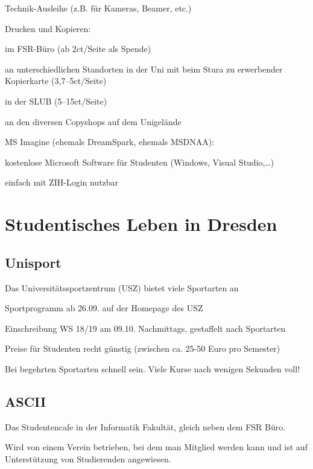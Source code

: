 \documentclass[a4paper,12pt]{report}
\begin{document}
\begin{itemize*}
\begin{itemize*}
        \item Technik-Ausleihe (z.B. für Kameras, Beamer, etc.)
    \end{itemize*}
    \item Drucken und Kopieren:
    \begin{itemize*}
        \item im FSR-Büro (ab 2ct/Seite als Spende)
        \item an unterschiedlichen Standorten in der Uni mit beim Stura zu erwerbender Kopierkarte (3,7--5ct/Seite)
        \item in der SLUB (5--15ct/Seite)
        \item an den diversen Copyshops auf dem Unigelände
    \end{itemize*}
    \item MS Imagine (ehemals DreamSpark, ehemals MSDNAA):
    \begin{itemize*}
        \item kostenlose Microsoft Software für Studenten (Windows, Visual Studio,\dots)
        \item einfach mit ZIH-Login nutzbar
    \end{itemize*}
\end{itemize*}

\section{Studentisches Leben in Dresden}

\subsection{Unisport}
Das Universitätssportzentrum (USZ) bietet viele Sportarten an
\begin{itemize*}
\item Sportprogramm ab 26.09. auf der Homepage des USZ
\item Einschreibung WS 18/19 am 09.10. Nachmittags, gestaffelt nach Sportarten
\item Preise für Studenten recht günstig (zwischen ca. 25-50 Euro pro Semester)
\item Bei begehrten Sportarten schnell sein. Viele Kurse nach wenigen Sekunden voll!
\end{itemize*}

\subsection{ASCII}
\begin{itemize*}
\item Das Studentencafe in der Informatik Fakultät, gleich neben dem FSR Büro.
\item Wird von einem Verein betrieben, bei dem man Mitglied werden kann und ist auf Unterstützung von Studierenden angewiesen.
\end{itemize*}
\end{document}
